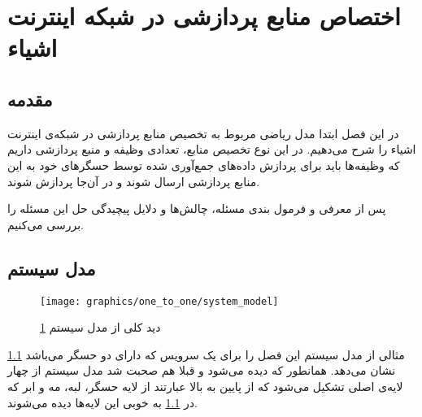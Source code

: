 \chapter{اختصاص منابع پردازشی در شبکه اینترنت اشیاء}\label{chap:system_model}
  \thispagestyle{empty}
  \section{مقدمه}
    در این فصل ابتدا مدل ریاضی مربوط به تخصیص منابع پردازشی در شبکه‌ی اینترنت اشیاء را شرح می‌دهیم. 
    در این نوع تخصیص منابع، تعدادی وظیفه و منبع پردازشی داریم که وظیفه‌ها باید برای پردازش داده‌های جمع‌آوری شده توسط حسگر‌های خود به این منابع پردازشی ارسال شوند و در آن‌جا پردازش شوند.

    پس از معرفی و فرمول بندی مسئله، چالش‌ها و دلایل پیچیدگی حل این مسئله را بررسی می‌کنیم.
  \section{مدل سیستم}
    \begin{figure}[h]
      \centerline{\texttt{[image: graphics/one\_to\_one/system\_model]}}
      \caption{دید کلی از مدل سیستم \cref{chap:system_model}}
      \label{fig:system_model}
    \end{figure}

	    \cref{fig:system_model} مثالی از مدل سیستم این فصل را برای یک سرویس که دارای دو حسگر می‌باشد نشان می‌دهد. همانطور که دیده می‌شود و قبلا هم صحبت شد مدل سیستم از چهار لایه‌ی اصلی تشکیل می‌شود که از پایین به بالا عبارتند از لایه حسگر، لبه، مه و ابر که در \cref{fig:system_model} به خوبی این لایه‌ها دیده می‌شوند. 
    
